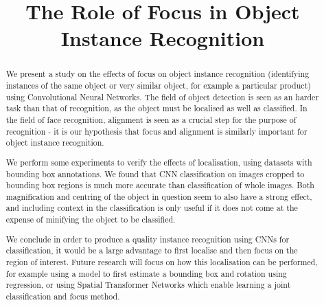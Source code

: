 \documentclass[conference]{IEEEtran}
\begin{document}
\title{The Role of Focus in Object Instance Recognition}


\author{
}



\maketitle

\begin{abstract}

We present a study on the effects of focus on object instance recognition (identifying instances of the same object or very similar object, for example a particular product) using Convolutional Neural Networks. The field of object detection is seen as an harder task than that of recognition, as the object must be localised as well as classified. In the field of face recognition, alignment is seen as a crucial step for the purpose of recognition - it is our hypothesis that focus and alignment is similarly important for object instance recognition. 

We perform some experiments to verify the effects of localisation, using datasets with bounding box annotations. We found that CNN classification on images cropped to bounding box regions is much more accurate than classification of whole images. Both magnification and centring of the object in question seem to also have a strong effect, and including context in the classification is only useful if it does not come at the expense of minifying the object to be classified.
 
We conclude in order to produce a quality instance recognition using CNNs for classification, it would be a large advantage to first localise and then focus on the region of interest. Future research will focus on how this localisation can be performed, for example using a model to first estimate a bounding box and rotation using regression, or using Spatial Transformer Networks which enable learning a joint classification and focus method.

\end{abstract}
\end{document}
